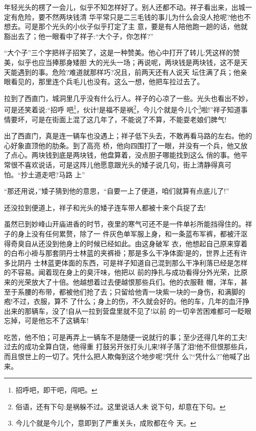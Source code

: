 \documentclass[11pt,a4paper,onecolumn]{article}
\begin{document}
年轻光头的楞了一会儿，似乎不知怎样好了。别人还都不动。祥子看出来，出城一定有危险，要不然两块钱清
华\myrule 平常只是二三毛钱的事儿\myrule 为什么会没人抢呢?他也不想去。可是那个光头的小伙子似乎打定了主
意，要是有人陪他跑一趟的话，他就豁出去了；他一眼看中了祥子:``大个子，你怎样?''

``大个子''三个字把祥子招笑了，这是一种赞美。他心中打开了转儿:凭这样的赞美，似乎也应当捧那身矮胆
大的光头一场；再说呢，两块钱是两块钱，这不是天天能遇到的事。危险?难道就那样巧?况且，前两天还有人说天
坛住满了兵；他亲眼看见的，那里连个兵毛儿也没有。这么一想，他把车拉过去了。

拉到了西直门，城洞里几乎没有什么行人。祥子的心凉了一些。光头也看出不妙，可是还笑着说:``招呼
吧\footnote{招呼吧，即干吧，闯吧。}，伙计!是福不是祸\footnote{俗语，还有下句:是祸躲不过。这里说话人未
  说下句，却意在下句。}，今儿个就是今儿个\footnote{今儿个就是今儿个，意即到了严重关头，成败都在今
  天。}啦!''祥子知道事情要坏，可是在街面上混了这几年了，不能说了不算，不能耍老娘们脾气!

出了西直门，真是连一辆车也没遇上；祥子低下头去，不敢再看马路的左右。他的心好象直顶他的肋条。到了高亮
桥，他向四围打了一眼，并没有一个兵，他又放了点心。两块钱到底是两块钱，他盘算着，没点胆子哪能找到这么
俏的事。他平常很不喜欢说话，可是这阵儿他愿意跟光头的矮子说几句，街上清静得真可怕。``抄土道走吧?马路
上\myrule ''

``那还用说，''矮子猜到他的意思，``自要一上了便道，咱们就算有点底儿了!''

还没拉到便道上，祥子和光头的矮子连车带人都被十来个兵捉了去!

虽然已到妙峰山开庙进香的时节，夜里的寒气可还不是一件单衫所能挡得住的。祥子的身上没有任何累赘，除了一
件灰色单军服上身，和一条蓝布军裤，都被汗沤得奇臭\myrule 自从还没到他身上的时候已经如此。由这身破军
衣，他想起自己原来穿着的白布小褂与那套阴丹士林蓝的夹裤褂；那是多么干净体面!是的，世界上还有许多比阴丹
士林蓝更体面的东西，可是祥子知道自己混到那么干净利落已经是怎样的不容易。闻着现在身上的臭汗味，他把以
前的挣扎与成功看得分外光荣，比原来的光荣放大了十倍。他越想着过去便越恨那些兵们。他的衣服鞋
帽，洋车，甚至于系腰的布带，都被他们抢了去；只留给他青一块紫一块的一身伤，和满脚的疱!不过，衣服，算不
了什么；身上的伤，不久就会好的。他的车，几年的血汗挣出来的那辆车，没了!自从一拉到营盘里就不见了!以前
的一切辛苦困难都可一眨眼忘掉，可是他忘不了这辆车!

吃苦，他不怕；可是再弄上一辆车不是随便一说就行的事；至少还得几年的工夫!过去的成功全算白饶，他得重
打鼓另开张打头儿来!祥子落了泪!他不但恨那些兵，而且恨世上的一切了。凭什么把人欺侮到这个地步呢?凭什
么?``凭什么?''他喊了出来。
\end{document}
